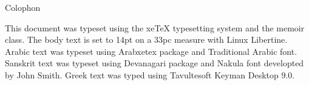 \documentclass[a4paper,14pt]{memoir}
\begin{document}
\clearpage
{}
\pagestyle{headings}



\tableofcontents*   %
%


\mainmatter
{}
\pagestyle{ocd}

%
%
%
%
%
%
%
%
%
%
%
%



\backmatter

\printindex

\cleardoublepage
\pagestyle{empty}
\null\vfil

\begin{adjustwidth}{1in}{1in}
\begin{center}
{\Large\textsf{Colophon}}
\end{center}
\begin{center}
  This document was typeset using the xeTeX typesetting system
  and the memoir class. The body text is set to 14pt on a
  33pc measure with Linux Libertine. Arabic text was typeset using Arabxetex
	package and Traditional Arabic font. Sanskrit text was typeset using
	Devanagari package and Nakula font developted by John Smith.
	Greek text was typed using Tavultesoft Keyman Desktop 9.0.
\end{center}
\end{adjustwidth}

\vfil
\end{document}
